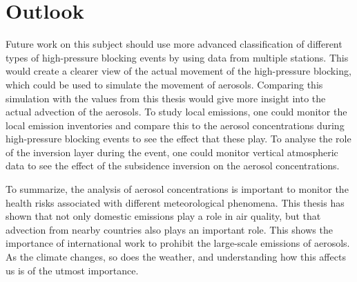 \section{Outlook}
Future work on this subject should use more advanced classification of different types of high-pressure blocking events by using data from multiple stations. This would create a clearer view of the actual movement of the high-pressure blocking, which could be used to simulate the movement of aerosols. Comparing this simulation with the values from this thesis would give more insight into the actual advection of the aerosols. To study local emissions, one could monitor the local emission inventories and compare this to the aerosol concentrations during high-pressure blocking events to see the effect that these play. To analyse the role of the inversion layer during the event, one could monitor vertical atmospheric data to see the effect of the subsidence inversion on the aerosol concentrations.

To summarize, the analysis of aerosol concentrations is important to monitor the health risks associated with different meteorological phenomena. This thesis has shown that not only domestic emissions play a role in air quality, but that advection from nearby countries also plays an important role. This shows the importance of international work to prohibit the large-scale emissions of aerosols. As the climate changes, so does the weather, and understanding how this affects us is of the utmost importance.

